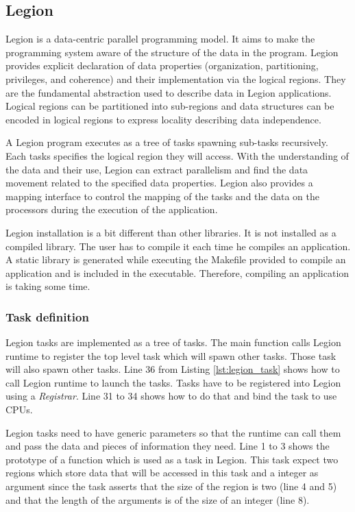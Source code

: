 \subsection{Legion}
Legion \cite{BaTSA2012} is a data-centric parallel programming model.
It aims to make the programming system aware of the structure of the data in the program.
Legion provides explicit declaration of data properties (organization, partitioning, privileges, and coherence) and their implementation via the logical regions.
They are the fundamental abstraction used to describe data in Legion applications.
Logical regions can be partitioned into sub-regions and data structures can be encoded in logical regions to express locality describing data independence.

A Legion program executes as a tree of tasks spawning sub-tasks recursively.
Each tasks specifies the logical region they will access.
With the understanding of the data and their use, Legion can extract parallelism and find the data movement related to the specified data properties.
Legion also provides a mapping interface to control the mapping of the tasks and the data on the processors during the execution of the application.

Legion installation is a bit different than other libraries.
It is not installed as a compiled library.
The user has to compile it each time he compiles an application.
A static library is generated while executing the Makefile provided to compile an application and is included in the executable.
Therefore, compiling an application is taking some time.

\begin{figure}

\end{figure}

\subsubsection{Task definition}
Legion tasks are implemented as a tree of tasks.
The main function calls Legion runtime to register the top level task which will spawn other tasks.
Those task will also spawn other tasks.
Line 36 from Listing \ref{lst:legion_task} shows how to call Legion runtime to launch the tasks.
Tasks have to be registered into Legion using a \textit{Registrar}.
Line 31 to 34 shows how to do that and bind the task to use CPUs.

Legion tasks need to have generic parameters so that the runtime can call them and pass the data and pieces of information they need.
Line 1 to 3 shows the prototype of a function which is used as a task in Legion.
This task expect two regions which store data that will be accessed in this task and a integer as argument since the task asserts that the size of the region is two (line 4 and 5) and that the length of the arguments is of the size of an integer (line 8).

